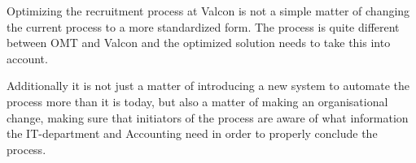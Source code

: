 Optimizing the recruitment process at Valcon is not a simple matter of changing the current process to a more standardized form.
The process is quite different between OMT and Valcon and the optimized solution needs to take this into account.

Additionally it is not just a matter of introducing a new system to automate the process more than it is today, but also a matter of making an organisational change,
 making sure that initiators of the process are aware of what information the IT-department and Accounting need in order to properly conclude the process.
